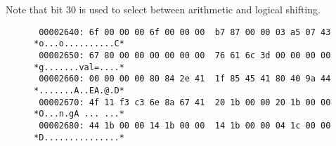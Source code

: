 \begin{figure}[ht]
\centering
\DrawInsnOpIShiftTypeDecoding
{}
\label{Figure:shamt_i_type_decode}
\label{shamt.i:decode}
\end{figure}

Note that bit 30 is used to select between arithmetic and logical shifting.

\begin{figure}[ht]
\centering
\begin{verbatim}
 00002640: 6f 00 00 00 6f 00 00 00  b7 87 00 00 03 a5 07 43 *o...o..........C*
 00002650: 67 80 00 00 00 00 00 00  76 61 6c 3d 00 00 00 00 *g.......val=....*
 00002660: 00 00 00 00 80 84 2e 41  1f 85 45 41 80 40 9a 44 *.......A..EA.@.D*
 00002670: 4f 11 f3 c3 6e 8a 67 41  20 1b 00 00 20 1b 00 00 *O...n.gA ... ...*
 00002680: 44 1b 00 00 14 1b 00 00  14 1b 00 00 04 1c 00 00 *D...............*
\end{verbatim}
\label{Figure:imm:memory:dump}
\end{figure}


